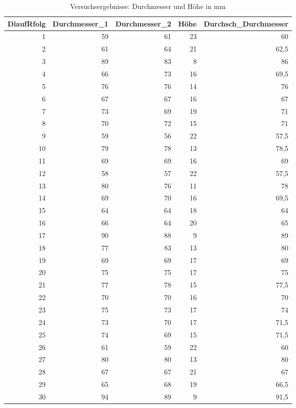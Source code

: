 \begin{table}[H]
\centering
\caption{Versuchsergebnisse: Durchmesser und Höhe in mm}
\label{tab:ergebnisse}
\begin{tabular}{|r|r|r|r|r|}
\hline
DlaufRfolg & Durchmesser\_1 & Durchmesser\_2 & Höhe & Durchsch\_Durchmesser \\
\hline
1 & 59 & 61 & 23 & 60 \\
2 & 61 & 64 & 21 & 62,5 \\
3 & 89 & 83 & 8 & 86 \\
4 & 66 & 73 & 16 & 69,5 \\
5 & 76 & 76 & 14 & 76 \\
6 & 67 & 67 & 16 & 67 \\
7 & 73 & 69 & 19 & 71 \\
8 & 70 & 72 & 15 & 71 \\
9 & 59 & 56 & 22 & 57,5 \\
10 & 79 & 78 & 13 & 78,5 \\
\hline
11 & 69 & 69 & 16 & 69 \\
12 & 58 & 57 & 22 & 57,5 \\
13 & 80 & 76 & 11 & 78 \\
14 & 69 & 70 & 16 & 69,5 \\
15 & 64 & 64 & 18 & 64 \\
16 & 66 & 64 & 20 & 65 \\
17 & 90 & 88 & 9 & 89 \\
18 & 77 & 83 & 13 & 80 \\
19 & 69 & 69 & 17 & 69 \\
20 & 75 & 75 & 17 & 75 \\
\hline
21 & 77 & 78 & 15 & 77,5 \\
22 & 70 & 70 & 16 & 70 \\
23 & 75 & 73 & 17 & 74 \\
24 & 73 & 70 & 17 & 71,5 \\
25 & 74 & 69 & 15 & 71,5 \\
26 & 61 & 59 & 22 & 60 \\
27 & 80 & 80 & 13 & 80 \\
28 & 67 & 67 & 21 & 67 \\
29 & 65 & 68 & 19 & 66,5 \\
30 & 94 & 89 & 9 & 91,5 \\
\hline
\end{tabular}
\end{table}
